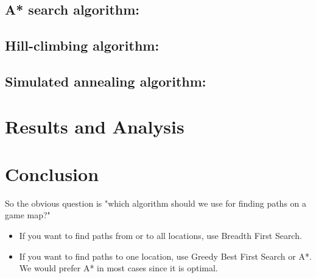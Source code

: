 \documentclass[a4paper]{article}
\begin{document}

\subsection{A* search algorithm:}


\subsection{Hill-climbing algorithm:}


\subsection{Simulated annealing algorithm:}


\section{Results and Analysis}



\section{Conclusion}

So the obvious question is "which algorithm should we use for finding paths on a game map?"

\begin{itemize}
\item If you want to find paths from or to all locations, use Breadth First Search.
\item If you want to find paths to one location, use Greedy Best First Search or A*. We would prefer A* in most cases since it is optimal.
\end{itemize}
\end{document}
